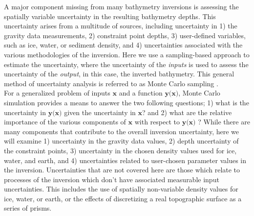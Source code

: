 A major component missing from many bathymetry inversions is assessing the spatially variable uncertainty in the resulting bathymetry depths. This uncertainty arises from a multitude of sources, including uncertainty in 1) the gravity data measurements, 2) constraint point depths, 3) user-defined variables, such as ice, water, or sediment density, and 4) uncertainties associated with the various methodologies of the inversion. Here we use a sampling-based approach to estimate the uncertainty, where the uncertainty of the \textit{inputs} is used to assess the uncertainty of the \textit{output}, in this case, the inverted bathymetry. This general method of uncertainty analysis is referred to as Monte Carlo sampling \citep{jansenmonte1994}.\\

For a generalized problem of inputs $\textbf{x}$ and a function $\textbf{y(x)}$, Monte Carlo simulation provides a means to answer the two following questions; 1) what is the uncertainty in $\textbf{y(x)}$ given the uncertainty in $\textbf{x}$? and 2) what are the relative importance of the various components of $\textbf{x}$ with respect to $\textbf{y(x)}$ \citep{heltonsurvey2006}? While there are many components that contribute to the overall inversion uncertainty, here we will examine 1) uncertainty in the gravity data values, 2) depth uncertainty of the constraint points, 3) uncertainty in the chosen density values used for ice, water, and earth, and 4) uncertainties related to user-chosen parameter values in the inversion. Uncertainties that are not covered here are those which relate to processes of the inversion which don't have associated measurable input uncertainties. This includes the use of spatially non-variable density values for ice, water, or earth, or the effects of discretizing a real topographic surface as a series of prisms.\\

